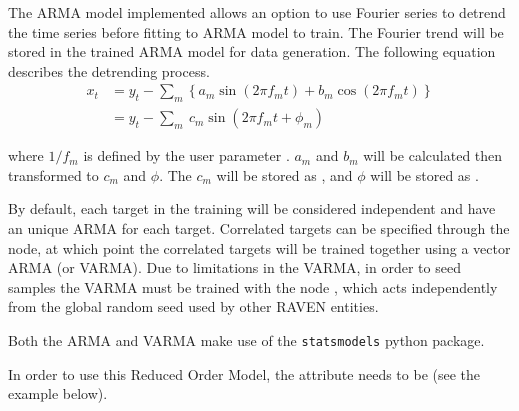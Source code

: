 The ARMA model implemented allows an option to use Fourier series to detrend the time series before fitting to ARMA model to
train. The Fourier trend will be stored in the trained ARMA model for data generation. The following equation
describes the detrending
process.
\begin{equation*}
\begin{aligned}
x_t &= y_t - \sum_m\left\{a_m\sin(2\pi f_mt)+b_m\cos(2\pi f_mt)\right\}  \\
&=y_t - \sum_m\ c_m\sin(2\pi f_mt+\phi_m)
\end{aligned}
\end{equation*}

where $1/f_m$ is defined by the user parameter . \nb $a_m$ and $b_m$ will be calculated then transformed to
$c_m$ and $\phi$. The $c_m$ will be stored as , and $\phi$ will be stored as .

By default, each target in the training will be considered independent and have an unique ARMA for each
target.  Correlated targets can be specified through the  node, at which point
the correlated targets will be trained together using a vector ARMA (or VARMA). Due to limitations in
the VARMA, in order to seed samples the VARMA must be trained with the node , which acts
independently from the global random seed used by other RAVEN entities.

Both the ARMA and VARMA make use of the \texttt{statsmodels} python package.

%
In order to use this Reduced Order Model, the  attribute
 needs to be  (see the example
below).
%
\subnodeIntro

